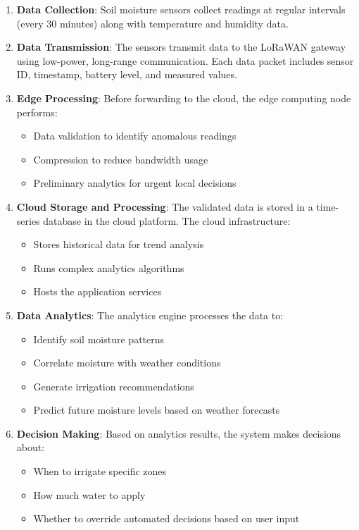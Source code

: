 \documentclass[12pt,a4paper]{article}
\begin{document}
\begin{enumerate}
    \item \textbf{Data Collection}: Soil moisture sensors collect readings at regular intervals (every 30 minutes) along with temperature and humidity data.
    
    \item \textbf{Data Transmission}: The sensors transmit data to the LoRaWAN gateway using low-power, long-range communication. Each data packet includes sensor ID, timestamp, battery level, and measured values.
    
    \item \textbf{Edge Processing}: Before forwarding to the cloud, the edge computing node performs:
    \begin{itemize}
        \item Data validation to identify anomalous readings
        \item Compression to reduce bandwidth usage
        \item Preliminary analytics for urgent local decisions
    \end{itemize}
    
    \item \textbf{Cloud Storage and Processing}: The validated data is stored in a time-series database in the cloud platform. The cloud infrastructure:
    \begin{itemize}
        \item Stores historical data for trend analysis
        \item Runs complex analytics algorithms
        \item Hosts the application services
    \end{itemize}
    
    \item \textbf{Data Analytics}: The analytics engine processes the data to:
    \begin{itemize}
        \item Identify soil moisture patterns
        \item Correlate moisture with weather conditions
        \item Generate irrigation recommendations
        \item Predict future moisture levels based on weather forecasts
    \end{itemize}
    
    \item \textbf{Decision Making}: Based on analytics results, the system makes decisions about:
    \begin{itemize}
        \item When to irrigate specific zones
        \item How much water to apply
        \item Whether to override automated decisions based on user input
    \end{itemize}
    

\end{enumerate}
\end{document}
